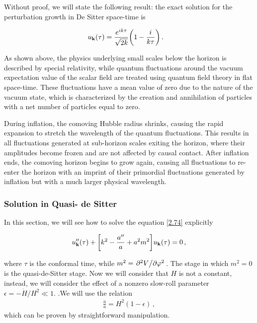  Without proof, we will state the following result: the exact solution for the perturbation growth in De Sitter space-time is 

\begin{align}
     u_{\mathbf{k}}(\tau ) &= \frac{e^{ik \tau }}{\sqrt{2 k}} \qty(1 - \frac{i}{k \tau })
    \,.
\end{align}

As shown above, the physics underlying small scales below the horizon is described by special relativity, while quantum fluctuations around the vacuum expectation value of the scalar field are treated using quantum field theory in flat space-time. These fluctuations have a mean value of zero due to the nature of the vacuum state, which is characterized by the creation and annihilation of particles with a net number of particles equal to zero.

During inflation, the comoving Hubble radius shrinks, causing the rapid expansion to stretch the wavelength of the quantum fluctuations. This results in all fluctuations generated at sub-horizon scales exiting the horizon, where their amplitudes become frozen and are not affected by causal contact. After inflation ends, the comoving horizon begins to grow again, causing all fluctuations to re-enter the horizon with an imprint of their primordial fluctuations generated by inflation but with a much larger physical wavelength.

\subsubsection*{Solution in Quasi- de Sitter}
In this section, we will see how to solve the equation \ref{2.74} explicitly 

\begin{align}
    u''_{\mathbf{k}} (\tau )
    + 
    \qty[k^2 - \frac{a''}{a} + a^2 m^2]  u_{\mathbf{k}}(\tau ) = 0\label{2.88}
    \,,
\end{align}

where \(\tau \) is the conformal time, while \(m^2 = \pdv*[2]{V}{\varphi }\). 
The stage in which \(m^2 = 0\) is the quasi-de-Sitter stage. 
Now we will consider that \(H\) is not a constant, instead, we will consider the effect of a nonzero slow-roll parameter \(\epsilon = - \dot{H} / H^2 \ll 1\). 
.We will use the relation
\begin{align}
    \frac{\ddot{a}}{a} = H^2 ( 1- \epsilon ) \label{2.89}
    \,,
\end{align}
which can be proven by straightforward manipulation.\\

